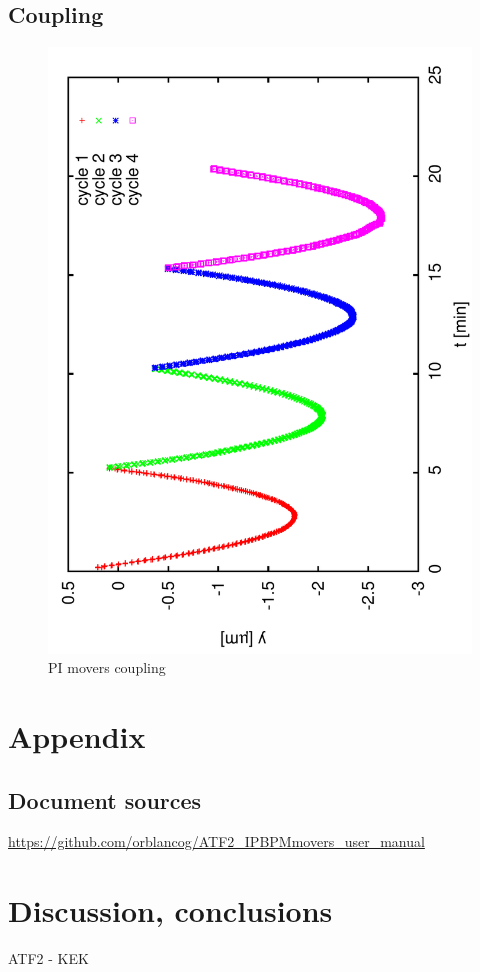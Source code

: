 \documentclass[a4paper,11pt]{book}
\begin{document}
\section{Coupling}
\begin{figure}
\centering
 \includegraphics[scale=0.5,angle=-90]{image41.pdf}\caption{PI movers coupling}\label{f-LinPI41}
\end{figure}

\appendix
\chapter{Appendix}
\section{Document sources}
\url{https://github.com/orblancog/ATF2_IPBPMmovers_user_manual}
\backmatter
\chapter{Discussion, conclusions}
\listoffigures
\listoftables
ATF2 - KEK
\end{document}
